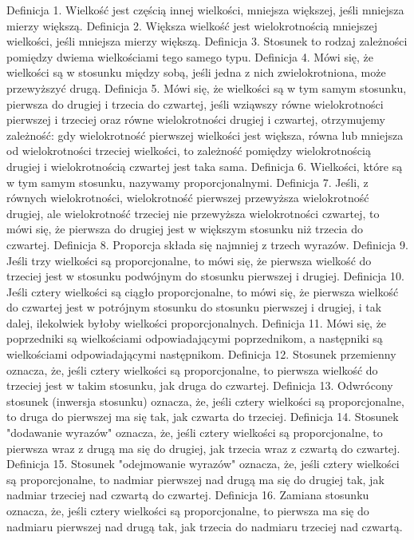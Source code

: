 Definicja 1.
    Wielkość jest częścią innej wielkości, mniejsza większej, jeśli mniejsza mierzy większą.
Definicja 2.
    Większa wielkość jest wielokrotnością mniejszej wielkości, jeśli mniejsza mierzy większą.
Definicja 3.
    Stosunek to rodzaj zależności pomiędzy dwiema wielkościami tego samego typu.
Definicja 4.
    Mówi się, że wielkości są w stosunku między sobą, jeśli jedna z nich zwielokrotniona, może przewyższyć drugą.
Definicja 5.
    Mówi się, że wielkości są w tym samym stosunku, pierwsza do drugiej i trzecia do czwartej, jeśli wziąwszy równe wielokrotności pierwszej i trzeciej oraz równe wielokrotności drugiej i czwartej, otrzymujemy zależność: gdy wielokrotność pierwszej wielkości jest większa, równa lub mniejsza od wielokrotności trzeciej wielkości, to zależność pomiędzy wielokrotnością drugiej i wielokrotnością czwartej jest taka sama.
Definicja 6.
    Wielkości, które są w tym samym stosunku, nazywamy proporcjonalnymi.
Definicja 7.
    Jeśli, z równych wielokrotności, wielokrotność pierwszej przewyższa wielokrotność drugiej, ale wielokrotność trzeciej nie przewyższa wielokrotności czwartej, to mówi się, że pierwsza do drugiej jest w większym stosunku niż trzecia do czwartej.
Definicja 8.
    Proporcja składa się najmniej z trzech wyrazów.
Definicja 9.
    Jeśli trzy wielkości są proporcjonalne, to mówi się, że pierwsza wielkość do trzeciej jest w stosunku podwójnym do stosunku pierwszej i drugiej.
Definicja 10.
    Jeśli cztery wielkości są ciągło proporcjonalne, to mówi się, że pierwsza wielkość do czwartej jest w potrójnym stosunku do stosunku pierwszej i drugiej, i tak dalej, ilekolwiek byłoby wielkości proporcjonalnych.
Definicja 11.
    Mówi się, że poprzedniki są wielkościami odpowiadającymi poprzednikom, a następniki są wielkościami odpowiadającymi następnikom.
Definicja 12.
    Stosunek przemienny oznacza, że, jeśli cztery wielkości są proporcjonalne, to pierwsza wielkość do trzeciej jest w takim stosunku, jak druga do czwartej.
Definicja 13.
    Odwrócony stosunek (inwersja stosunku) oznacza, że, jeśli cztery wielkości są proporcjonalne, to druga do pierwszej ma się tak, jak czwarta do trzeciej.
Definicja 14.
    Stosunek "dodawanie wyrazów" oznacza, że, jeśli cztery wielkości są proporcjonalne, to pierwsza wraz z drugą ma się do drugiej, jak trzecia wraz z czwartą do czwartej.
Definicja 15.
    Stosunek "odejmowanie wyrazów" oznacza, że, jeśli cztery wielkości są proporcjonalne, to nadmiar pierwszej nad drugą ma się do drugiej tak, jak nadmiar trzeciej nad czwartą do czwartej.
Definicja 16.
    Zamiana stosunku oznacza, że, jeśli cztery wielkości są proporcjonalne, to pierwsza ma się do nadmiaru pierwszej nad drugą tak, jak trzecia do nadmiaru trzeciej nad czwartą.
